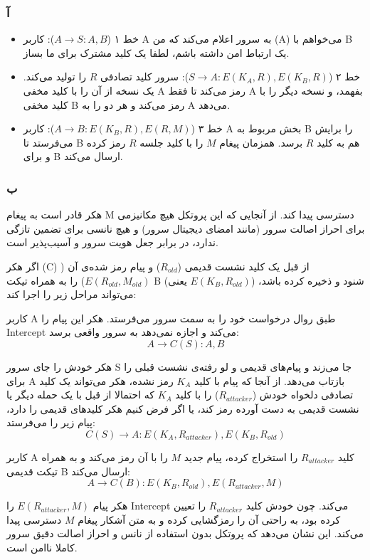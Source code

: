 
\subsubsection*{آ}
\begin{itemize}
    \item {خط ۱ ($A \rightarrow S: A, B$):} کاربر A به سرور اعلام می‌کند که من (A) می‌خواهم با B یک ارتباط امن داشته باشم، لطفا یک کلید مشترک برای ما بساز.
    \item {خط ۲ ($S \rightarrow A: E(K_A, R), E(K_B, R)$):} سرور کلید تصادفی $R$ را تولید می‌کند. یک نسخه از آن را با کلید مخفی A رمز می‌کند تا فقط A بفهمد، و نسخه دیگر را با کلید مخفی B رمز می‌کند و هر دو را به A می‌دهد.
    \item {خط ۳ ($A \rightarrow B: E(K_B, R), E(R, M)$):} کاربر A بخش مربوط به B را برایش می‌فرستد تا B هم به کلید $R$ برسد. همزمان پیغام $M$ را با کلید جلسه $R$ رمز کرده و برای B ارسال می‌کند.
\end{itemize}

\medskip
\subsubsection*{ب}



هکر قادر است به پیغام M دسترسی پیدا کند. از آنجایی که این پروتکل هیچ مکانیزمی برای احراز اصالت سرور (مانند امضای دیجیتال سرور) و هیچ نانسی برای تضمین تازگی ندارد، در برابر جعل هویت سرور و  آسیب‌پذیر است.

اگر هکر (C) از قبل یک کلید نشست قدیمی ($R_{old}$) و پیام رمز شده‌ی آن ($E(R_{old}, M_{old})$) را به همراه تیکت B (یعنی $E(K_B, R_{old})$) شنود و ذخیره کرده باشد، می‌تواند مراحل زیر را اجرا کند:


 کاربر A طبق روال درخواست خود را به سمت سرور می‌فرستد. هکر این پیام را Intercept می‌کند و اجازه نمی‌دهد به سرور واقعی برسد:
    $$ A \rightarrow C(S): A, B$$
    
 هکر خودش را جای سرور S جا می‌زند و پیام‌های قدیمی و لو رفته‌ی نشست قبلی را برای A بازتاب می‌دهد. از آنجا که پیام با کلید $K_A$ رمز نشده، هکر می‌تواند یک کلید تصادفی دلخواه خودش ($R_{attacker}$) را با کلید $K_A$ که احتمالا از قبل با یک حمله دیگر یا نشست قدیمی به دست آورده رمز کند، یا اگر فرض کنیم هکر کلیدهای قدیمی را دارد، پیام زیر را می‌فرستد:
    $$ C(S) \rightarrow A: E(K_A, R_{attacker}), E(K_B, R_{old})$$
    
 کاربر A کلید $R_{attacker}$ را استخراج کرده، پیام جدید $M$ را با آن رمز می‌کند و به همراه تیکت قدیمی B ارسال می‌کند:
    $$ A \rightarrow C(B): E(K_B, R_{old}), E(R_{attacker}, M)$$

هکر پیام $E(R_{attacker}, M)$ را Intercept می‌کند. چون خودش کلید $R_{attacker}$ را تعیین کرده بود، به راحتی آن را رمزگشایی کرده و به متن آشکار پیغام $M$ دسترسی پیدا می‌کند. این نشان می‌دهد که پروتکل بدون استفاده از نانس و احراز اصالت دقیق سرور کاملا ناامن است.